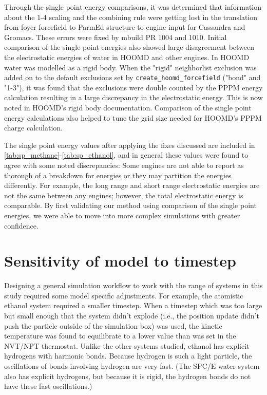 Through the single point energy comparisons, it was determined that information about the 1-4 scaling and the combining rule were getting lost in the translation from foyer forcefield to ParmEd structure to engine input for Cassandra and Gromacs.
These errors were fixed by mbuild PR 1004 and 1010.
Initial comparison of the single point energies also showed large disagreement between the electrostatic energies of water in HOOMD and other engines. 
In HOOMD water was modelled as a rigid body. 
When the "rigid" neighborlist exclusion was added on to the default exclusions set by \lstinline{create_hoomd_forcefield} ("bond" and "1-3"), it was found that the exclusions were double counted by the PPPM energy calculation resulting in a large discrepancy in the electrostatic energy.
This is now noted in HOOMD's rigid body documentation.
Comparison of the single point energy calculations also helped to tune the grid size needed for HOOMD's PPPM charge calculation. 

The single point energy values after applying the fixes discussed are included in \autoref{tab:sp_methane}-\autoref{tab:sp_ethanol}, and in general these values were found to agree with some noted discrepancies:
Some engines are not able to report as thorough of a breakdown for energies or they may partition the energies differently.
For example, the long range and short range electrostatic energies are not the same between any engines; however, the total electrostatic energy is comparable.
By first validating our method using comparison of the single point energies, we were able to move into more complex simulations with greater confidence.

\section{Sensitivity of model to timestep}

Designing a general simulation workflow to work with the range of systems in this study required some model specific adjustments.
For example, the atomistic ethanol system required a smaller timestep.
When a timestep which was too large but small enough that the system didn't explode (i.e., the position update didn't push the particle outside of the simulation box) was used, the kinetic temperature was found to equilibrate to a lower value than was set in the NVT/NPT thermostat.
Unlike the other systems studied, ethanol has explicit hydrogens with harmonic bonds. 
Because hydrogen is such a light particle, the oscillations of bonds involving hydrogen are very fast.
(The SPC/E water system also has explicit hydrogens, but because it is rigid, the hydrogen bonds do not have these fast oscillations.) 

